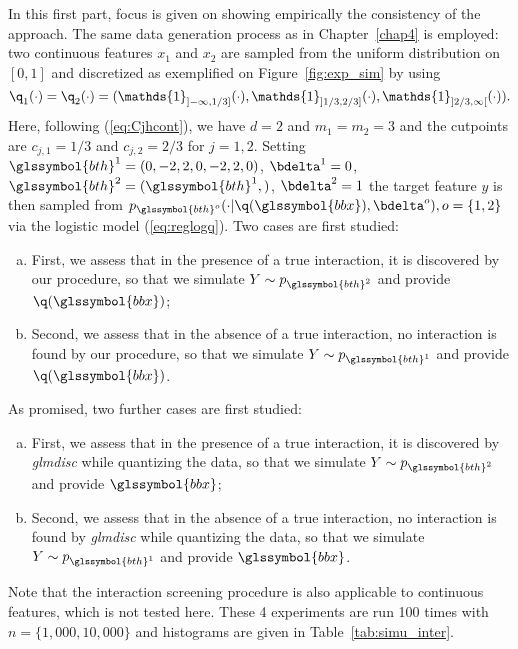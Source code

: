 In this first part, focus is given on showing empirically the consistency of the approach. The same data generation process as in Chapter~\ref{chap4} is employed: two continuous features $x_1$ and $x_2$ are sampled from the uniform distribution on $[0,1]$ and discretized as exemplified on Figure~\ref{fig:exp_sim} by using
\[\q_1(\cdot)=\q_2(\cdot) = (\mathds{1}_{]-\infty,1/3]}(\cdot),\mathds{1}_{]1/3,2/3]}(\cdot),\mathds{1}_{]2/3,\infty[}(\cdot)).\]
Here, following (\ref{eq:Cjhcont}), we have $d=2$ and $m_1=m_2=3$ and the cutpoints are $c_{j,1}=1/3$ and $c_{j,2}=2/3$ for $j=1,2$. Setting $\glssymbol{bth}^{1}=(0,-2,2,0,-2,2,0)$, $\bdelta^{1} = 0$, $\glssymbol{bth}^{2} = (\glssymbol{bth}^{1},)$, $\bdelta^{2} = 1$ the target feature $y$ is then sampled from $p_{\glssymbol{bth}^{o}}(\cdot | \q(\glssymbol{bbx}), \bdelta^{o}), o = \{1,2\}$ via the logistic model (\ref{eq:reglogq}). Two cases are first studied:
\begin{enumerate}[(a)]
    \item First, we assess that in the presence of a true interaction, it is discovered by our procedure, so that we simulate $Y \sim p_{\glssymbol{bth}^{2}}$ and provide $\q(\glssymbol{bbx})$;
    \item Second, we assess that in the absence of a true interaction, no interaction is found by our procedure, so that we simulate $Y \sim p_{\glssymbol{bth}^{1}}$ and provide $\q(\glssymbol{bbx})$.
\end{enumerate}
As promised, two further cases are first studied:
\begin{enumerate}[(a)]
    \item First, we assess that in the presence of a true interaction, it is discovered by \textit{glmdisc} while quantizing the data, so that we simulate $Y \sim p_{\glssymbol{bth}^{2}}$ and provide $\glssymbol{bbx}$;
    \item Second, we assess that in the absence of a true interaction, no interaction is found by \textit{glmdisc} while quantizing the data, so that we simulate $Y \sim p_{\glssymbol{bth}^{1}}$ and provide $\glssymbol{bbx}$.
\end{enumerate}
Note that the interaction screening procedure is also applicable to continuous features, which is not tested here. These 4 experiments are run 100 times with $n = \{1{,}000,10{,}000\}$ and histograms are given in Table~\ref{tab:simu_inter}.

